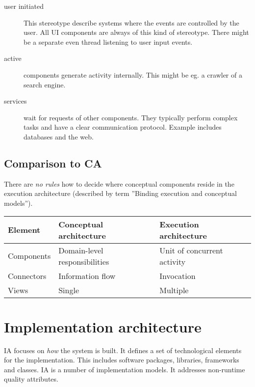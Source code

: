\documentclass[a4paper]{report}
\begin{document}
\begin{description}
  \item[user initiated]
    This stereotype describe systems where the events are controlled by the
    user. All UI components are always of this kind of stereotype. There
    might be a separate even thread listening to user input events.
  \item[active]
    components generate activity internally. This might be eg. a crawler of a
    search engine.
  \item[services]
    wait for requests of other components. They typically perform complex
    tasks and have a clear communication protocol. Example includes
    databases and the web.
\end{description}

\section{Comparison to CA}

There are \emph{no rules} how to decide where conceptual components reside
in the execution architecture (described by term ''Binding execution and
conceptual models'').

\begin{table}[h]
  \begin{center}
    \begin{tabular}{lll}
      Element & Conceptual architecture & Execution architecture \\
    \hline \hline
      Components & Domain-level responsibilities & Unit of concurrent
      activity \\

      Connectors & Information flow & Invocation \\
      Views & Single & Multiple \\
    \end{tabular}
  \end{center}
\end{table}





\chapter{Implementation architecture}

IA focuses on \emph{how} the system is built. It defines a set of
technological elements for the implementation. This includes software
packages, libraries, frameworks and classes. IA is a number of
implementation models. It addresses non-runtime quality attributes.
\end{document}
